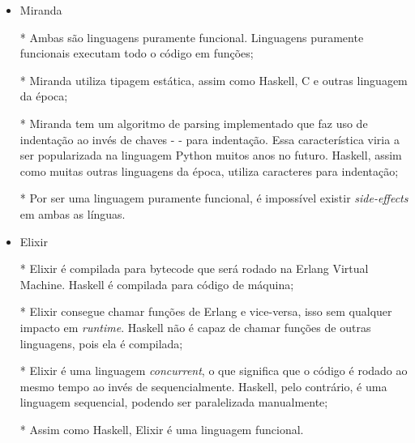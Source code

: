 \begin{itemize}
  \item Miranda 
  
  * Ambas são linguagens puramente funcional. Linguagens puramente funcionais executam todo o código em funções;

  * Miranda utiliza tipagem estática, assim como Haskell, C e outras linguagem da época;

  * Miranda tem um algoritmo de parsing implementado que faz uso de indentação ao invés de chaves - { } - para indentação. 
  Essa característica viria a ser popularizada na linguagem Python muitos anos no futuro. Haskell, assim como muitas outras linguagens da época, 
  utiliza caracteres para indentação;

  * Por ser uma linguagem puramente funcional, é impossível existir \emph{side-effects} em ambas as línguas.
  
  \item Elixir 

* Elixir é compilada para bytecode que será rodado na Erlang Virtual Machine. Haskell é compilada para código de máquina;

* Elixir consegue chamar funções de Erlang e vice-versa, isso sem qualquer impacto em \emph{runtime}. Haskell não é capaz de chamar funções de outras linguagens, pois ela é compilada;

* Elixir é uma linguagem \emph{concurrent}, o que significa que o código é rodado ao mesmo tempo ao invés de sequencialmente. Haskell, pelo contrário, é uma linguagem sequencial, podendo ser paralelizada manualmente;

* Assim como Haskell, Elixir é uma linguagem funcional.


\end{itemize}

\newpage